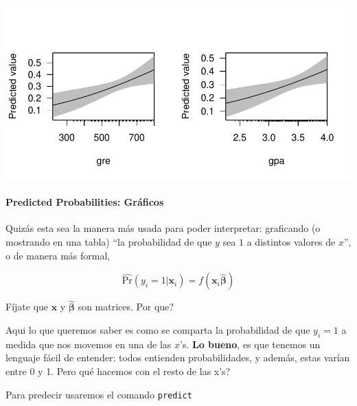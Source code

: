\documentclass[onesided]{article}\usepackage[]{graphicx}\usepackage[]{color}
\makeatletter
\def\maxwidth{ %
  \ifdim\Gin@nat@width>\linewidth
    \linewidth
  \else
    \Gin@nat@width
  \fi
}
\newenvironment{knitrout}{}{} %
\makeatother
\begin{document}
\begin{knitrout}
{\centering \includegraphics[width=\maxwidth]{figure/sc3-1} 

}



\end{knitrout}


\paragraph{Predicted Probabilities: Gr\'aficos}

Quiz\'as esta sea la manera m\'as usada para poder interpretar: graficando (o mostrando en una tabla) ``la probabilidad de que $y$ sea $1$ a distintos valores de $x$'', o de manera m\'as formal, 

\begin{equation}%
\hat{\text{Pr}}(y_{i}=1|{\mathbf x}_{i}) = f({\mathbf x}_{i}\hat{\mathbf \beta})
\end{equation}

F\'ijate que ${\mathbf x}$ y $\hat{\mathbf \beta}$ son matrices. {\color{red}Por que?} 

Aqui lo que queremos saber es como se comparta la probabilidad de que $y_{i}=1$ a medida que nos movemos en una de las $x$'s. {\bf Lo bueno}, es que tenemos un lenguaje f\'acil de entender: todos entienden probabilidades, y adem\'as, estas var\'ian entre 0 y 1. {\color{red}Pero qu\'e hacemos con el resto de las x's?}

Para predecir usaremos el comando \texttt{predict}
\end{document}
